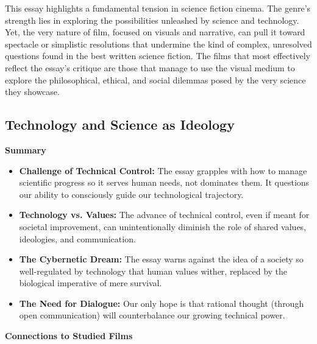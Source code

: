 \documentclass[11pt,fleqn]{book} %
\begin{document}
\vspace{5pt}

This essay highlights a fundamental tension in science fiction cinema. The genre's strength lies in exploring the possibilities unleashed by science and technology. Yet, the very nature of film, focused on visuals and narrative, can pull it toward spectacle or simplistic resolutions that undermine the kind of complex, unresolved questions found in the best written science fiction. The films that most effectively reflect the essay's critique are those that manage to use the visual medium to explore the philosophical, ethical, and social dilemmas posed by the very science they showcase. 



\subsection{Technology and Science as Ideology}
\textbf{Summary}

\begin{itemize}
\item \textbf{Challenge of Technical Control:} The essay grapples with how to manage scientific progress so it serves human needs, not dominates them. It questions our ability to consciously guide our technological trajectory.  

\item \textbf{Technology vs. Values:}  The advance of technical control, even  if meant for societal improvement, can unintentionally diminish the role of shared values, ideologies, and communication.

\item \textbf{The Cybernetic Dream:} The essay warns against the idea of a society so well-regulated by technology that human values wither, replaced by the biological imperative of mere survival. 

\item \textbf{The Need for Dialogue:}  Our only hope is that rational thought (through open communication) will counterbalance our growing technical power. 
\end{itemize}
\vspace{5pt}
\textbf{Connections to Studied Films}
\end{document}
